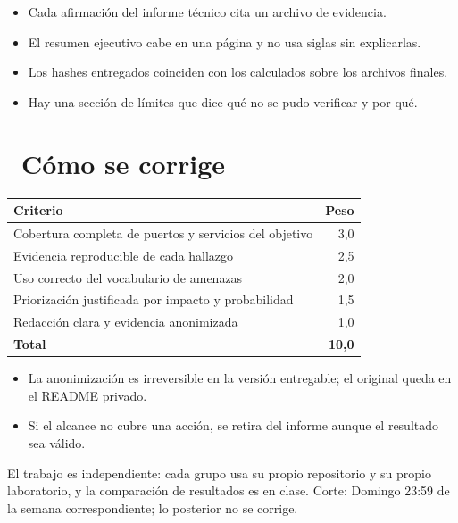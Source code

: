 \documentclass[11pt,a4paper]{article}
\newcommand{\iconotexto}[2]{\textcolor{cyanNeon}{\faIcon{#1}}~#2}
\begin{document}
\begin{itemize}[leftmargin=1.4em,itemsep=2pt,topsep=3pt]
  \item Cada afirmación del informe técnico cita un archivo de evidencia.
  \item El resumen ejecutivo cabe en una página y no usa siglas sin explicarlas.
  \item Los hashes entregados coinciden con los calculados sobre los archivos finales.
  \item Hay una sección de límites que dice qué no se pudo verificar y por qué.
\end{itemize}

\section{\iconotexto{ruler-combined}{Cómo se corrige}}

\begin{tabularx}{\linewidth}{@{}X r@{}}
\toprule
Criterio & Peso\\
\midrule
Cobertura completa de puertos y servicios del objetivo & 3,0 \\
Evidencia reproducible de cada hallazgo & 2,5 \\
Uso correcto del vocabulario de amenazas & 2,0 \\
Priorización justificada por impacto y probabilidad & 1,5 \\
Redacción clara y evidencia anonimizada & 1,0 \\
\midrule
\textbf{Total} & \textbf{10,0}\\
\bottomrule
\end{tabularx}

\begin{itemize}[leftmargin=1.4em,itemsep=2pt,topsep=3pt]
  \item La anonimización es irreversible en la versión entregable; el original queda en el README privado.
  \item Si el alcance no cubre una acción, se retira del informe aunque el resultado sea válido.
\end{itemize}

\begin{cajaRecuerda}El trabajo es independiente: cada grupo usa su propio repositorio y su propio laboratorio, y la comparación de resultados es en clase. Corte: Domingo 23:59 de la semana correspondiente; lo posterior no se corrige.
\end{cajaRecuerda}
\end{document}
